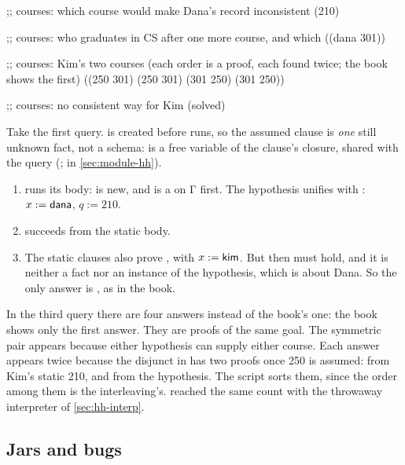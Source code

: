 \begin{answers}
;; courses: which course would make Dana's record inconsistent
(210)

;; courses: who graduates in CS after one more course, and which
((dana 301))

;; courses: Kim's two courses (each order is a proof, each found twice; the book shows the first)
((250 301) (250 301) (301 250) (301 250))

;; courses: no consistent way for Kim
(solved)
\end{answers}

\begin{tutorial}
Take the first query.  is created before  runs, so the assumed clause
 is \emph{one} still unknown fact, not a schema:  is a free
variable of the clause's closure, shared with the query (;  in \cref{sec:module-hh}).
\begin{enumerate}
  \item {} runs its body:  is new, and  is a
     on Γ first. The hypothesis unifies  with
    : $x:=\mathsf{dana}$, $q:=210$.
  \item {} succeeds from the static body.
  \item The static clauses also prove , with $x:=\mathsf{kim}$. But then
     must hold, and it is neither a fact nor an instance of the hypothesis,
    which is about Dana. So the only answer is , as in the book.
\end{enumerate}
In the third query there are four answers instead of the book's one: the book shows only the first
answer. They are proofs of the same goal. The symmetric pair appears because either hypothesis can
supply either course. Each answer appears twice because the disjunct
 in  has two proofs once
250 is assumed: from Kim's static 210, and from the hypothesis. The script sorts them, since the order
among them is the interleaving's.  reached the same count with the throwaway interpreter
of \cref{sec:hh-interp}.
\end{tutorial}

\subsection{Jars and bugs}

